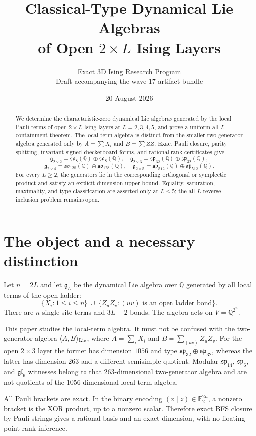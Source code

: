 \documentclass[11pt]{article}
\title{Classical-Type Dynamical Lie Algebras\\of Open $2\times L$ Ising Layers}
\author{Exact 3D Ising Research Program\\\small Draft accompanying the wave-17 artifact bundle}
\date{20 August 2026}
\newcommand{\Q}{\mathbb Q}
\newcommand{\F}{\mathbb F}
\newcommand{\g}{\mathfrak g}
\newcommand{\so}{\mathfrak{so}}
\renewcommand{\sp}{\mathfrak{sp}}
\newcommand{\gl}{\mathfrak{gl}}
\begin{document}
\maketitle
\begin{abstract}
We determine the characteristic-zero dynamical Lie algebras generated by the local Pauli terms of open $2\times L$ Ising layers at $L=2,3,4,5$, and prove a uniform all-$L$ containment theorem.  The local-term algebra is distinct from the smaller two-generator algebra generated only by $A=\sum X_i$ and $B=\sum ZZ$.  Exact Pauli closure, parity splitting, invariant signed checkerboard forms, and rational rank certificates give
\[
\g_{2\times2}=\so_8(\mathbb Q)\oplus\so_8(\mathbb Q),\quad
\g_{2\times3}=\sp_{32}(\mathbb Q)\oplus\sp_{32}(\mathbb Q),
\]
\[
\g_{2\times4}=\so_{128}(\mathbb Q)\oplus\so_{128}(\mathbb Q),\quad
\g_{2\times5}=\sp_{512}(\mathbb Q)\oplus\sp_{512}(\mathbb Q).
\]
For every $L\ge2$, the generators lie in the corresponding orthogonal or symplectic product and satisfy an explicit dimension upper bound.  Equality, saturation, maximality, and type classification are asserted only at $L\le5$; the all-$L$ reverse-inclusion problem remains open.
\end{abstract}

\section{The object and a necessary distinction}
Let $n=2L$ and let $\g_L$ be the dynamical Lie algebra over $\Q$ generated by all local terms of the open ladder:
\[
 \{X_i:1\le i\le n\}\ \cup\ \{Z_uZ_v:(uv)\text{ is an open ladder bond}\}.
\]
There are $n$ single-site terms and $3L-2$ bonds.  The algebra acts on $V=\Q^{2^n}$.

This paper studies the local-term algebra.  It must not be confused with the two-generator algebra $\langle A,B\rangle_{\rm Lie}$, where $A=\sum_iX_i$ and $B=\sum_{(uv)}Z_uZ_v$.  For the open $2\times3$ layer the former has dimension $1056$ and type $\sp_{32}\oplus\sp_{32}$, whereas the latter has dimension $263$ and a different semisimple quotient.  Modular $\sp_{14}$, $\sp_6$, and $\gl_6$ witnesses belong to that 263-dimensional two-generator algebra and are not quotients of the 1056-dimensional local-term algebra.

All Pauli brackets are exact.  In the binary encoding $(x\mid z)\in\F_2^{2n}$, a nonzero bracket is the XOR product, up to a nonzero scalar.  Therefore exact BFS closure by Pauli strings gives a rational basis and an exact dimension, with no floating-point rank inference.
\end{document}
